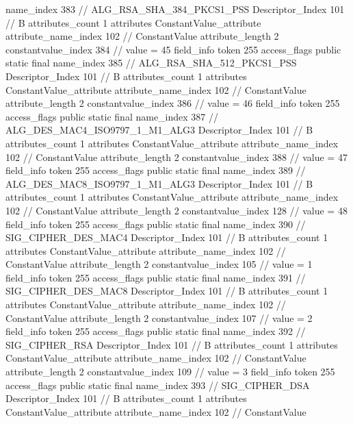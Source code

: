 {{{{{				name_index	383		// ALG_RSA_SHA_384_PKCS1_PSS
				Descriptor_Index	101		// B
				attributes_count	1
				attributes {
				ConstantValue_attribute {
					attribute_name_index	102		// ConstantValue
					attribute_length	2
					constantvalue_index	384		// value = 45
				}
				}
			}
			field_info {
				token	255
				access_flags	public static final
				name_index	385		// ALG_RSA_SHA_512_PKCS1_PSS
				Descriptor_Index	101		// B
				attributes_count	1
				attributes {
				ConstantValue_attribute {
					attribute_name_index	102		// ConstantValue
					attribute_length	2
					constantvalue_index	386		// value = 46
				}
				}
			}
			field_info {
				token	255
				access_flags	public static final
				name_index	387		// ALG_DES_MAC4_ISO9797_1_M1_ALG3
				Descriptor_Index	101		// B
				attributes_count	1
				attributes {
				ConstantValue_attribute {
					attribute_name_index	102		// ConstantValue
					attribute_length	2
					constantvalue_index	388		// value = 47
				}
				}
			}
			field_info {
				token	255
				access_flags	public static final
				name_index	389		// ALG_DES_MAC8_ISO9797_1_M1_ALG3
				Descriptor_Index	101		// B
				attributes_count	1
				attributes {
				ConstantValue_attribute {
					attribute_name_index	102		// ConstantValue
					attribute_length	2
					constantvalue_index	128		// value = 48
				}
				}
			}
			field_info {
				token	255
				access_flags	public static final
				name_index	390		// SIG_CIPHER_DES_MAC4
				Descriptor_Index	101		// B
				attributes_count	1
				attributes {
				ConstantValue_attribute {
					attribute_name_index	102		// ConstantValue
					attribute_length	2
					constantvalue_index	105		// value = 1
				}
				}
			}
			field_info {
				token	255
				access_flags	public static final
				name_index	391		// SIG_CIPHER_DES_MAC8
				Descriptor_Index	101		// B
				attributes_count	1
				attributes {
				ConstantValue_attribute {
					attribute_name_index	102		// ConstantValue
					attribute_length	2
					constantvalue_index	107		// value = 2
				}
				}
			}
			field_info {
				token	255
				access_flags	public static final
				name_index	392		// SIG_CIPHER_RSA
				Descriptor_Index	101		// B
				attributes_count	1
				attributes {
				ConstantValue_attribute {
					attribute_name_index	102		// ConstantValue
					attribute_length	2
					constantvalue_index	109		// value = 3
				}
				}
			}
			field_info {
				token	255
				access_flags	public static final
				name_index	393		// SIG_CIPHER_DSA
				Descriptor_Index	101		// B
				attributes_count	1
				attributes {
				ConstantValue_attribute {
					attribute_name_index	102		// ConstantValue
}}}}}}}
